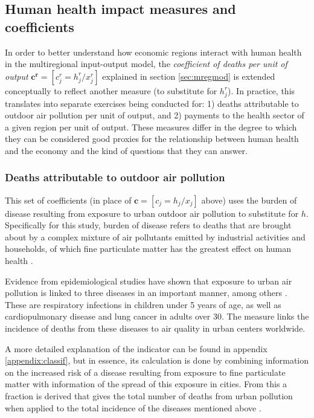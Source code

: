 \documentclass[a4paper,12pt]{article}
\begin{document}
\subsection{Human health impact measures and coefficients}
\label{sec:vars}

In order to better understand how economic regions interact with human health in the multiregional input-output model, the \textit{coefficient of deaths per unit of output} $\mathbf{c^r}=[c^r_{j}=h^r_j/x^r_j]$ explained in section \ref{sec:mregmod} is extended conceptually to reflect another measure (to substitute for $h^r_j$). In practice, this translates into separate
exercises being conducted for: 1) deaths attributable to outdoor air pollution per unit of output, and 2) payments to the health sector of a given region per unit of output. These measures differ in the degree to which they can be considered good proxies for the relationship between human health and the economy and the kind of questions that they can answer. 


\subsubsection{Deaths attributable to outdoor air pollution} \label{subsec:polludeath}

This set of coefficients (in place of $\mathbf{c}=[c_{j}=h_j/x_j]$ above) uses the burden of disease resulting from exposure to urban outdoor air pollution to substitute for $h$. Specifically for this study, burden of disease refers to deaths that are brought about by a complex mixture of air pollutants emitted by industrial activities and households, of which fine particulate matter has the greatest effect on human health \citep{cohenurban2004}.

Evidence from epidemiological studies have shown that exposure to urban air pollution is linked to three diseases in an important manner, among others \citep{ostro2004outdoor}. These are respiratory infections in children under 5 years of age,  as well as cardiopulmonary disease and lung cancer in adults over 30. The measure links the incidence of deaths from these diseases to air quality in urban centers worldwide.

A more detailed explanation of the indicator can be found in appendix \ref{appendix:classif}, but in essence, its calculation is done by combining information on the increased risk of a disease resulting from exposure to fine particulate matter with information of the spread of this exposure in cities. From this a fraction is derived that gives the total number of deaths from urban pollution when applied to the total incidence of the diseases mentioned above \citep*{who2012}.
\end{document}
